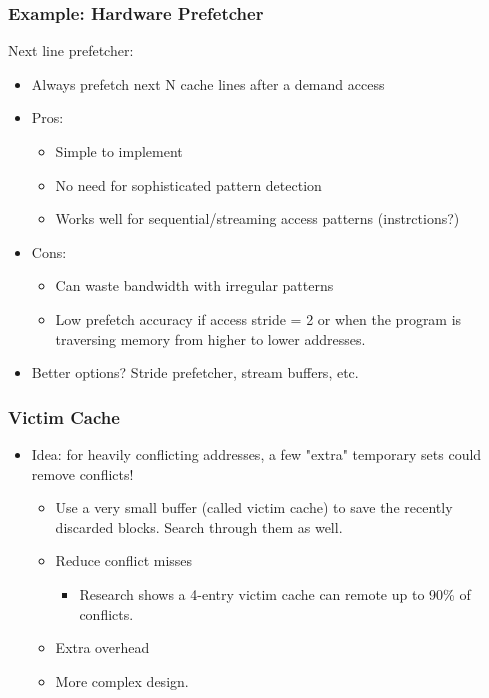 \documentclass[10pt]{article}
\begin{document}
\subsubsection*{Example: Hardware Prefetcher}
Next line prefetcher:
\begin{itemize}
    \item Always prefetch next N cache lines after a demand access
    \item Pros:
    \begin{itemize}
        \item Simple to implement
        \item No need for sophisticated pattern detection
        \item Works well for sequential/streaming access patterns (instrctions?)
    \end{itemize}
    \item Cons:
    \begin{itemize}
        \item Can waste bandwidth with irregular patterns
        \item Low prefetch accuracy if access stride = 2 or when the program is traversing memory from higher to lower addresses.
    \end{itemize}
    \item Better options?  Stride prefetcher, stream buffers, etc.
\end{itemize}

\subsubsection*{Victim Cache}
\begin{itemize}
    \item Idea: for heavily conflicting addresses, a few "extra" temporary sets could remove conflicts!
    \begin{itemize}
        \item Use a very small buffer (called victim cache) to save the recently discarded blocks.  Search through them as well.
        \item Reduce conflict misses
        \begin{itemize}
            \item Research shows a 4-entry victim cache can remote up to 90\% of conflicts.
        \end{itemize}
        \item Extra overhead
        \item More complex design.
    \end{itemize}
\end{itemize}
\end{document}
